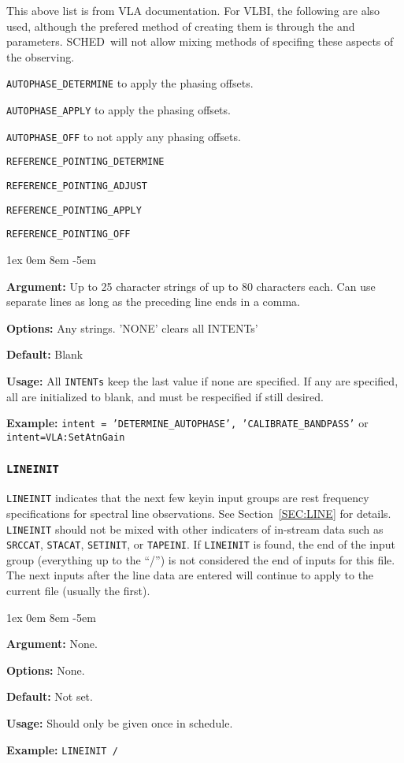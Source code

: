 \documentclass{report}
\newcommand{\schedb}{{\sc SCHED~}}
\newcommand{\rcwbox}[5]{
  \begin{list}{}{\parsep 1ex  \itemsep 0em
                 \leftmargin 8em  \itemindent -5em }
    \item {\bf Argument:} #1
    \item {\bf Options:}  #2
    \item {\bf Default:}  #3
    \item {\bf Usage:}    #4
    \item {\bf Example:}  #5
  \end{list}
}
\begin{document}
This above list is from VLA documentation.  For VLBI, the following
are also used, although the prefered method of creating them is
through the  and 
 parameters.  \schedb will not
allow mixing methods of specifing these aspects of the observing.

\begin{list}{}{\parsep 0em  \itemsep 0em }
\item {\tt AUTOPHASE\_DETERMINE} to apply the phasing offsets.
\item {\tt AUTOPHASE\_APPLY} to apply the phasing offsets.
\item {\tt AUTOPHASE\_OFF} to not apply any phasing offsets.
\item {\tt REFERENCE\_POINTING\_DETERMINE}
\item {\tt REFERENCE\_POINTING\_ADJUST}
\item {\tt REFERENCE\_POINTING\_APPLY}
\item {\tt REFERENCE\_POINTING\_OFF}
\end{list}

\rcwbox
{Up to 25 character strings of up to 80 characters each.  Can use 
separate lines as long as the preceding line ends in a comma.}
{Any strings.  'NONE' clears all INTENTs'}
{Blank}
{All {\tt INTENTs} keep the last value if none are specified.  If any
are specified, all are initialized to blank, and must be respecified
if still desired.}
{{\tt intent = 'DETERMINE\_AUTOPHASE', 'CALIBRATE\_BANDPASS'} or
{\tt intent=VLA:SetAtnGain}}


\subsubsection{\label{MP:LINEINIT}{\tt LINEINIT}}

{\tt LINEINIT} indicates that the next few keyin input groups are rest
frequency specifications for spectral line observations. See
Section~\ref{SEC:LINE} for details. {\tt LINEINIT} should not be
mixed with other indicaters of in-stream data such as {\tt SRCCAT},
{\tt STACAT}, {\tt SETINIT}, or {\tt TAPEINI}.  If {\tt LINEINIT}
is found, the end of the input group (everything up to the ``/'')
is not considered the end of inputs for this file.  The next inputs
after the line data are entered will continue to apply to the current
file (usually the first).

\rcwbox
{None.}
{None.}
{Not set.}
{Should only be given once in schedule.}
{{\tt LINEINIT /}}
\end{document}
